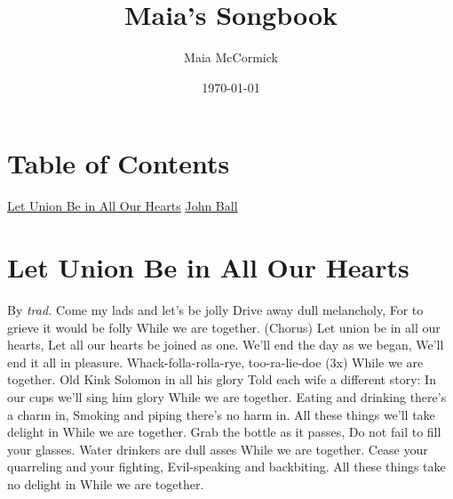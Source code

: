 \documentclass{article}%
\title{Maia's Songbook}%
\author{Maia McCormick}%
\date{\today}%
\begin{document}
%
\normalsize%
\maketitle%
\section{Table of Contents}%
\hyperref[letunionbeinallourhearts]{Let Union Be in All Our Hearts}%
\newline%
\hyperref[johnball]{John Ball}%
\newline

%
\newpage%
\section{Let Union Be in All Our Hearts}%
\label{letunionbeinallourhearts}%
By%
\textit{trad.}%
\newline%
Come my lads and let's be jolly\newline%
Drive away dull melancholy,\newline%
For to grieve it would be folly\newline%
While we are together.\newline%
\newline%
(Chorus)\newline%
Let union be in all our hearts,\newline%
Let all our hearts be joined as one.\newline%
We'll end the day as we began,\newline%
We'll end it all in pleasure.\newline%
Whack{-}folla{-}rolla{-}rye, too{-}ra{-}lie{-}doe (3x)\newline%
While we are together.\newline%
\newline%
Old Kink Solomon in all his glory\newline%
Told each wife a different story:\newline%
In our cups we'll sing him glory\newline%
While we are together.\newline%
\newline%
Eating and drinking there's a charm in,\newline%
Smoking and piping there's no harm in.\newline%
All these things we'll take delight in\newline%
While we are together.\newline%
\newline%
Grab the bottle as it passes,\newline%
Do not fail to fill your glasses.\newline%
Water drinkers are dull asses\newline%
While we are together.\newline%
\newline%
Cease your quarreling and your fighting,\newline%
Evil{-}speaking and backbiting.\newline%
All these things take no delight in\newline%
While we are together.\newline%
\end{document}
